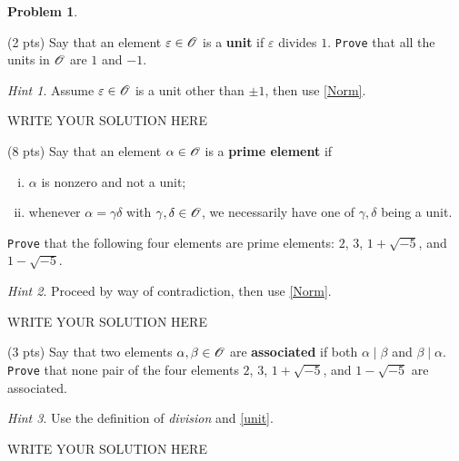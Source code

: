 \documentclass[11pt]{article}
\theoremstyle{plain}
\theoremstyle{definition}
\newtheorem{problem}{Problem}
\theoremstyle{remark}
\newtheorem*{hint}{Hint}
\numberwithin{equation}{problem}
\begin{document}
\begin{problem}
\begin{listinprob}
		\item\label{unit} (2 pts) Say that an element $\varepsilon\in\mathscr{O}$ is a \textbf{unit} if $\varepsilon$ divides $1$. 
		\texttt{Prove} that all the units in $\mathscr{O}$ are $1$ and $-1$.
		\begin{hint}
			Assume $\varepsilon\in\mathscr{O}$ is a unit other than $\pm 1$, then use \cref{Norm}.
		\end{hint}

\begin{solution} %
WRITE YOUR SOLUTION HERE
\end{solution}\clearpage %


		\item (8 pts) Say that an element $\alpha\in\mathscr{O}$ is a \textbf{prime element} if 
		\begin{enumerate}[(i)]
			\item $\alpha$ is nonzero and not a unit;
			\item whenever $\alpha=\gamma\delta$ with $\gamma, \delta \in \mathscr{O}$, we necessarily have one of $\gamma, \delta$ being a unit.
		\end{enumerate}
		\texttt{Prove} that the following four elements are prime elements: $2$, $3$, $1+\sqrt{-5}$, and $1-\sqrt{-5}$.
		\begin{hint}
			Proceed by way of contradiction, then use \cref{Norm}.
		\end{hint}

\begin{solution} %
WRITE YOUR SOLUTION HERE
\end{solution}\clearpage %


		\item (3 pts) Say that two elements $\alpha,\beta\in\mathscr{O}$ are \textbf{associated} if both $\alpha\mid\beta$ and $\beta\mid\alpha$. 
		\texttt{Prove} that none pair of the four elements $2$, $3$, $1+\sqrt{-5}$, and $1-\sqrt{-5}$ are associated. 
		\begin{hint}
			Use the definition of \emph{division} and \cref{unit}.
		\end{hint}

\begin{solution} %
WRITE YOUR SOLUTION HERE
\end{solution}\clearpage %


\end{listinprob}
\end{problem}
\end{document}
